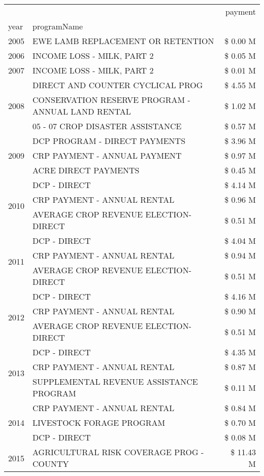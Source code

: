 \begin{tabular}{llr}
\toprule
 &  & payment \\
year & programName &  \\
\midrule
2005 & EWE LAMB REPLACEMENT OR RETENTION & \$ 0.00 M \\
\cline{1-3}
2006 & INCOME LOSS - MILK, PART 2 & \$ 0.05 M \\
\cline{1-3}
2007 & INCOME LOSS - MILK, PART 2 & \$ 0.01 M \\
\cline{1-3}
\multirow[t]{3}{*}{2008} & DIRECT AND COUNTER CYCLICAL PROG & \$ 4.55 M \\
 & CONSERVATION RESERVE PROGRAM - ANNUAL LAND RENTAL & \$ 1.02 M \\
 & 05 - 07 CROP DISASTER ASSISTANCE & \$ 0.57 M \\
\cline{1-3}
\multirow[t]{3}{*}{2009} & DCP PROGRAM - DIRECT PAYMENTS & \$ 3.96 M \\
 & CRP PAYMENT - ANNUAL PAYMENT & \$ 0.97 M \\
 & ACRE DIRECT PAYMENTS & \$ 0.45 M \\
\cline{1-3}
\multirow[t]{3}{*}{2010} & DCP - DIRECT & \$ 4.14 M \\
 & CRP PAYMENT - ANNUAL RENTAL & \$ 0.96 M \\
 & AVERAGE CROP REVENUE ELECTION-DIRECT & \$ 0.51 M \\
\cline{1-3}
\multirow[t]{3}{*}{2011} & DCP - DIRECT & \$ 4.04 M \\
 & CRP PAYMENT - ANNUAL RENTAL & \$ 0.94 M \\
 & AVERAGE CROP REVENUE ELECTION-DIRECT & \$ 0.51 M \\
\cline{1-3}
\multirow[t]{3}{*}{2012} & DCP - DIRECT & \$ 4.16 M \\
 & CRP PAYMENT - ANNUAL RENTAL & \$ 0.90 M \\
 & AVERAGE CROP REVENUE ELECTION-DIRECT & \$ 0.51 M \\
\cline{1-3}
\multirow[t]{3}{*}{2013} & DCP - DIRECT & \$ 4.35 M \\
 & CRP PAYMENT - ANNUAL RENTAL & \$ 0.87 M \\
 & SUPPLEMENTAL REVENUE ASSISTANCE PROGRAM & \$ 0.11 M \\
\cline{1-3}
\multirow[t]{3}{*}{2014} & CRP PAYMENT - ANNUAL RENTAL & \$ 0.84 M \\
 & LIVESTOCK FORAGE PROGRAM & \$ 0.70 M \\
 & DCP - DIRECT & \$ 0.08 M \\
\cline{1-3}
\multirow[t]{3}{*}{2015} & AGRICULTURAL RISK COVERAGE PROG - COUNTY & \$ 11.43 M \\

\end{tabular}
